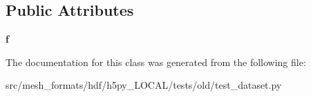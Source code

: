 \subsection*{Public Attributes}
\begin{DoxyCompactItemize}
\item 
\mbox{\label{classh5py__LOCAL_1_1tests_1_1old_1_1test__dataset_1_1BaseDataset_a854146d605e777dae532f793aef407f0}} 
{\bfseries f}
\end{DoxyCompactItemize}


The documentation for this class was generated from the following file\+:\begin{DoxyCompactItemize}
\item 
src/mesh\+\_\+formats/hdf/h5py\+\_\+\+L\+O\+C\+A\+L/tests/old/test\+\_\+dataset.\+py\end{DoxyCompactItemize}
